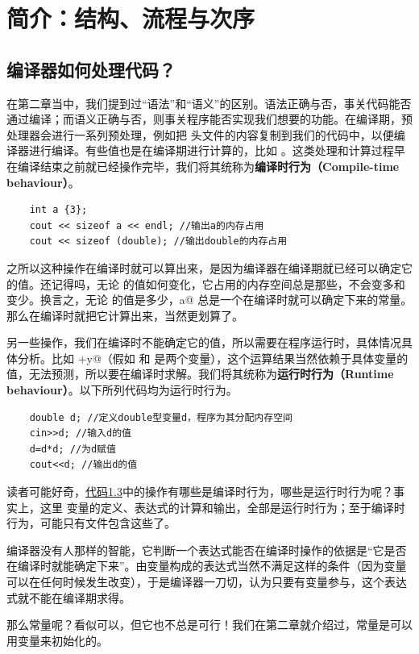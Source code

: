 \section{简介：结构、流程与次序}
\subsection*{编译器如何处理代码？}
在第二章当中，我们提到过``语法''和``语义''的区别。语法正确与否，事关代码能否通过编译；而语义正确与否，则事关程序能否实现我们想要的功能。在编译期，预处理器会进行一系列预处理，例如把 \lstinline@iostream@ 头文件的内容复制到我们的代码中，以便编译器进行编译。有些值也是在编译期进行计算的，比如 \lstinline@sizeof@。这类处理和计算过程早在编译结束之前就已经操作完毕，我们将其统称为\textbf{编译时行为（Compile-time behaviour）}。\par
\begin{lstlisting}
    int a {3};
    cout << sizeof a << endl; //输出a的内存占用
    cout << sizeof (double); //输出double的内存占用
\end{lstlisting}
之所以这种操作在编译时就可以算出来，是因为编译器在编译期就已经可以确定它的值。还记得吗，无论 \lstinline@a@ 的值如何变化，它占用的内存空间总是那些，不会变多和变少。换言之，无论 \lstinline@a@ 的值是多少，\lstinline@sizeof a@ 总是一个在编译时就可以确定下来的常量。那么在编译时就把它计算出来，当然更划算了。\par
另一些操作，我们在编译时不能确定它的值，所以需要在程序运行时，具体情况具体分析。比如 \lstinline@x+y@（假如 \lstinline@x@ 和 \lstinline@y@ 是两个变量），这个运算结果当然依赖于具体变量的值，无法预测，所以要在编译时求解。我们将其统称为\textbf{运行时行为（Runtime behaviour）}。以下所列代码均为运行时行为。
\begin{lstlisting}
    double d; //定义double型变量d，程序为其分配内存空间
    cin>>d; //输入d的值
    d=d*d; //为d赋值
    cout<<d; //输出d的值
\end{lstlisting}\par
读者可能好奇，\hyperref[lst:calc1]{代码1.3}中的操作有哪些是编译时行为，哪些是运行时行为呢？事实上，这里 \lstinline@double@ 变量的定义、表达式的计算和输出，全部是运行时行为；至于编译时行为，可能只有文件包含这些了。\par
编译器没有人那样的智能，它判断一个表达式能否在编译时操作的依据是``它是否在编译时就能确定下来''。由变量构成的表达式当然不满足这样的条件（因为变量可以在任何时候发生改变），于是编译器一刀切，认为只要有变量参与，这个表达式就不能在编译期求得。\par
那么常量呢？看似可以，但它也不总是可行！我们在第二章就介绍过，常量是可以用变量来初始化的。
